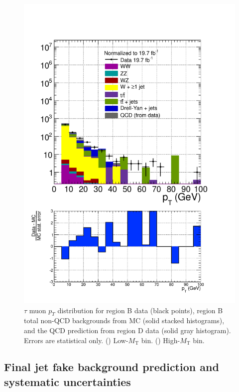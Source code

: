 \begin{figure}[hbtp]
\begin{center}
    \includegraphics[width=\cmsFigWidth]{figures/dataVsMCQCD_tauMuPT_highMT_v87}
    \caption{$\tau$ muon $p_T$ distribution for region B data (black points), region B total non-QCD backgrounds from MC (solid stacked histograms), and the QCD prediction from region D data (solid gray histogram).  Errors are statistical only. (\cmsLeft) Low-$M_{\text{T}}$ bin. (\cmsRight) High-$M_{\text{T}}$ bin.}
    \label{fig:regB-data-MC-tauMuPT}
  \end{center}
\end{figure}

\subsection{Final jet fake background prediction and systematic uncertainties\label{sec:bkgs-jet-fake-unc}}

